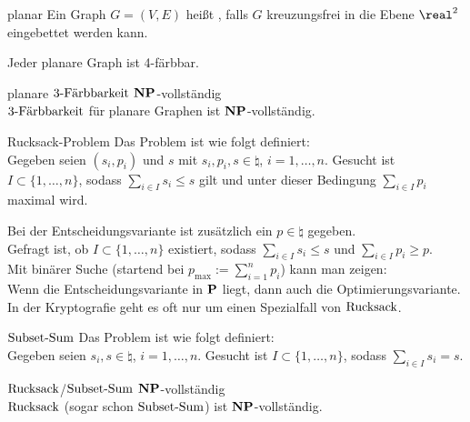 \linie

\begin{Def}{planar}
    Ein Graph $G = (V, E)$ heißt , falls $G$ kreuzungsfrei in die Ebene $\real^2$
    eingebettet werden kann.
\end{Def}

\begin{Bem}
    Jeder planare Graph ist 4-färbbar.
\end{Bem}

\begin{Satz}{planare $\kFaerbbarkeit{3}$ $\NP$-vollständig}\\
    $\kFaerbbarkeit{3}$ für planare Graphen ist $\NP$-vollständig.
\end{Satz}

\linie
\pagebreak

\begin{Def}{Rucksack-Problem}
    Das Problem \begriff{$\Rucksack$} ist wie folgt definiert:\\
    Gegeben seien $(s_i, p_i)$ und $s$ mit $s_i, p_i, s \in \natural$, $i = 1, \dotsc, n$.
    Gesucht ist $I \subset \{1, \dotsc, n\}$, sodass $\sum_{i \in I} s_i \le s$ gilt
    und unter dieser Bedingung $\sum_{i \in I} p_i$ maximal wird.
\end{Def}

\begin{Bem}
    Bei der Entscheidungsvariante ist zusätzlich ein $p \in \natural$ gegeben.\\
    Gefragt ist, ob $I \subset \{1, \dotsc, n\}$ existiert, sodass
    $\sum_{i \in I} s_i \le s$ und $\sum_{i \in I} p_i \ge p$.\\
    Mit binärer Suche (startend bei $p_{\max} := \sum_{i=1}^n p_i$) kann man zeigen:\\
    Wenn die Entscheidungsvariante in $\P$ liegt, dann auch die Optimierungsvariante.\\
    In der Kryptografie geht es oft nur um einen Spezialfall von $\Rucksack$.
\end{Bem}

\begin{Def}{$\SubsetSum$}
    Das Problem \begriff{$\Rucksack$} ist wie folgt definiert:\\
    Gegeben seien $s_i, s \in \natural$, $i = 1, \dotsc, n$.
    Gesucht ist $I \subset \{1, \dotsc, n\}$, sodass $\sum_{i \in I} s_i = s$.
\end{Def}

\begin{Satz}{$\Rucksack$/$\SubsetSum$ $\NP$-vollständig}\\
    $\Rucksack$ (sogar schon $\SubsetSum$) ist $\NP$-vollständig.
\end{Satz}

